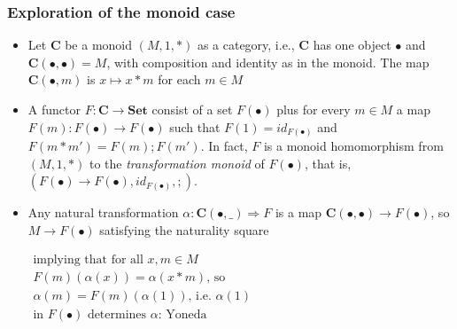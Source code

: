 \documentclass[handout]{beamer}
\newcommand{\To}{\Rightarrow}
\newcommand{\bfsf}[1]{{\boldsymbol{#1}}}
\newcommand{\Set}{\bfsf{Set}}
\newcommand{\CC}{\bfsf{C}}
\begin{document}
\frame
  {   
    \frametitle{Exploration of the monoid case}\label{Yon:Mon}

 \begin{itemize}[<+->]
\item Let $\CC$ be a monoid $(M,1,*)$ as a category, i.e., $\CC$ has one object
$\bullet$ and $\CC(\bullet,\bullet)=M$, with composition and identity as in the monoid.
The map $\CC(\bullet,m)$ is $x\mapsto x*m$ for each $m\in M$ %
\item A functor $F:\CC\to\Set$ consist of a set $F(\bullet)$ plus for every
$m\in M$ a map $F(m) : F(\bullet)\to F(\bullet)$ such that $F(1)= id_{F(\bullet)}$
and $F(m*m')=F(m);F(m')$. In fact, $F$ is a monoid homomorphism from
$(M,1,*)$ to the \emph{transformation monoid} of $F(\bullet)$, that is,
$(F(\bullet)\to F(\bullet), id_{F(\bullet)}, ;)$.
\item Any natural transformation $\alpha: \CC(\bullet,\_)\To F$ is
a map $\CC(\bullet,\bullet)\to F(\bullet)$, so $M\to F(\bullet)$ satisfying the naturality square
$\begin{array}{l}%
\text{implying that for all $x,m\in M$}\\
\text{$F(m)(\alpha(x)) = \alpha(x*m)$, so}\\
\text{$\alpha(m) = F(m)(\alpha(1))$, i.e.\ $\alpha(1)$}\\
\text{in $F(\bullet)$ determines $\alpha$: Yoneda}
\end{array}$

 \end{itemize}

 }
\end{document}
